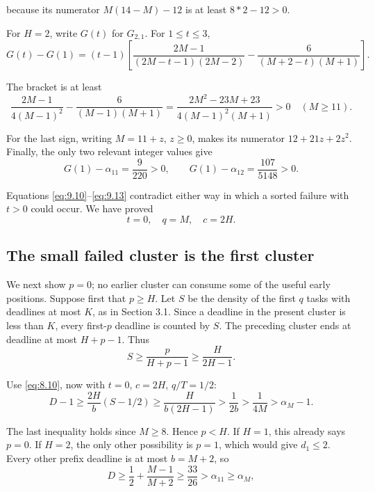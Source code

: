 \documentclass[11pt,a4paper]{article}
\begin{document}
because its numerator \(M(14-M)-12\) is at least \(8*2-12>0\).

For \(H=2\), write \(G(t)\) for \(G_{2,1}\). For \(1\le t\le 3\),
\begin{equation}
G(t)-G(1)=(t-1)
 \left[
 \frac{2M-1}{(2M-t-1)(2M-2)}
 -\frac6{(M+2-t)(M+1)}
 \right].
\tag{9.12}
\label{eq:9.12}
\end{equation}

The bracket is at least
\[
 \frac{2M-1}{4(M-1)^2}-\frac6{(M-1)(M+1)}
 =\frac{2M^2-23M+23}{4(M-1)^2(M+1)}>0
 \quad(M\ge11).
\]

For the last sign, writing \(M=11+z\), \(z\ge 0\), makes its numerator \(12+21z+2z^2\). Finally, the only two relevant integer values give
\begin{equation}
G(1)-\alpha_{11}=\frac9{220}>0,
 \qquad
 G(1)-\alpha_{12}=\frac{107}{5148}>0.
\tag{9.13}
\label{eq:9.13}
\end{equation}

Equations \eqref{eq:9.10}--\eqref{eq:9.13} contradict either way in which a sorted failure with \(t>0\) could occur. We have proved
\begin{equation}
\boxed{t=0,\quad q=M,\quad c=2H.}
\tag{9.14}
\label{eq:9.14}
\end{equation}

\hypertarget{the-small-failed-cluster-is-the-first-cluster}{%
\subsection{The small failed cluster is the first cluster}\label{the-small-failed-cluster-is-the-first-cluster}}

We next show \(p=0\); no earlier cluster can consume some of the useful early positions. Suppose first that \(p\ge H\). Let \(S\) be the density of the first \(q\) tasks with deadlines at most \(K\), as in Section 3.1. Since a deadline in the present cluster is less than \(K\), every first-\(p\) deadline is counted by \(S\). The preceding cluster ends at deadline at most \(H+p-1\). Thus
\[
 S\ge\frac p{H+p-1}\ge\frac H{2H-1}.
\]

Use \eqref{eq:8.10}, now with \(t=0\), \(c=2H\), \(q/T=1/2\):
\[
 D-1\ge\frac{2H}{b}(S-1/2)
 \ge\frac{H}{b(2H-1)}
 >\frac1{2b}>\frac1{4M}>\alpha_M-1.
\]

The last inequality holds since \(M\ge 8\). Hence \(p<H\). If \(H=1\), this already says \(p=0\). If \(H=2\), the only other possibility is \(p=1\), which would give \(d_1\le 2\). Every other prefix deadline is at most \(b=M+2\), so
\[
 D\ge\frac12+\frac{M-1}{M+2}
 \ge\frac{33}{26}>\alpha_{11}\ge\alpha_M,
\]
\end{document}
